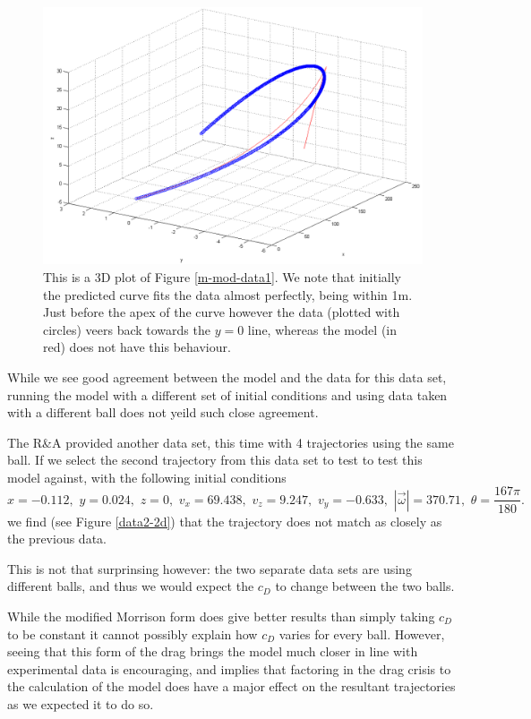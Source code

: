 \begin{figure}[h]
\centering
\includegraphics[scale=0.5]{../images/m-mod-data1-3d.png}
\caption[Model with using the modified Morrison form for $c_D$ in 3D.]{This is a 3D plot of Figure \ref{m-mod-data1}.
We note that initially the predicted curve fits the data almost perfectly, being within 1m. Just before
the apex of the curve however the data (plotted with circles) veers back towards the $y=0$ line, whereas
the model (in red) does not have this behaviour.}
\end{figure}

While we see good agreement between the model and the data for this data set, running the model with
a different set of initial conditions and using data taken with a different ball does not yeild such
close agreement.

The R\&A provided another data set, this time with 4 trajectories using the same ball. If we select
the second trajectory from this data set to test to test this model against, with the following 
initial conditions
\[
x = -0.112, \,\, y = 0.024, \,\, z = 0, \,\, v_x = 69.438, \,\, v_z = 9.247, \,\, v_y = -0.633, \,\,
|\vec{\omega}| = 370.71,\,\, \theta = \frac{167\pi}{180} .
\]
we find (see Figure \ref{data2-2d}) that the trajectory does not match as closely as the previous data.

This is not that surprinsing however: the two separate data sets are using different balls, and thus
we would expect the $c_D$ to change between the two balls.

While the modified Morrison form does give better results than simply taking $c_D$ to be constant
it cannot possibly explain how $c_D$ varies for every ball. However, seeing that this form of the drag
brings the model much closer in line with experimental data is encouraging, and implies that factoring
in the drag crisis to the calculation of the model does have a major effect on the resultant trajectories
as we expected it to do so.

